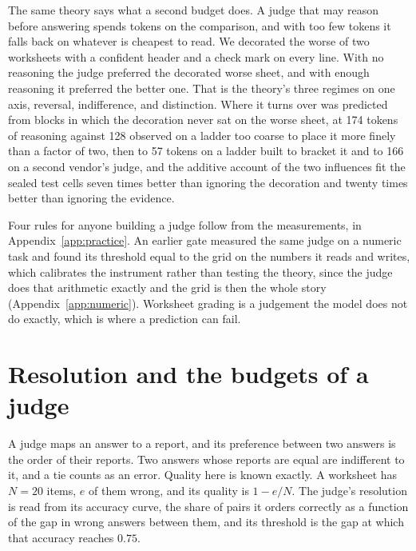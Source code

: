 \documentclass{article}
\theoremstyle{definition}
\theoremstyle{remark}
\begin{document}
The same theory says what a second budget does.
A judge that may reason before answering spends tokens on the comparison, and with too few tokens it falls back on whatever is cheapest to read.
We decorated the worse of two worksheets with a confident header and a check mark on every line.
With no reasoning the judge preferred the decorated worse sheet, and with enough reasoning it preferred the better one.
That is the theory's three regimes on one axis, reversal, indifference, and distinction.
Where it turns over was predicted from blocks in which the decoration never sat on the worse sheet, at 174 tokens of reasoning against 128 observed on a ladder too coarse to place it more finely than a factor of two, then to 57 tokens on a ladder built to bracket it and to 166 on a second vendor's judge, and the additive account of the two influences fit the sealed test cells seven times better than ignoring the decoration and twenty times better than ignoring the evidence.

Four rules for anyone building a judge follow from the measurements, in Appendix~\ref{app:practice}.
An earlier gate measured the same judge on a numeric task and found its threshold equal to the grid on the numbers it reads and writes, which calibrates the instrument rather than testing the theory, since the judge does that arithmetic exactly and the grid is then the whole story (Appendix~\ref{app:numeric}).
Worksheet grading is a judgement the model does not do exactly, which is where a prediction can fail.

\section{Resolution and the budgets of a judge}
\label{sec:budgets}

A judge maps an answer to a report, and its preference between two answers is the order of their reports.
Two answers whose reports are equal are indifferent to it, and a tie counts as an error.
Quality here is known exactly.
A worksheet has $N=20$ items, $e$ of them wrong, and its quality is $1-e/N$.
The judge's resolution is read from its accuracy curve, the share of pairs it orders correctly as a function of the gap in wrong answers between them, and its threshold is the gap at which that accuracy reaches $0.75$.
\end{document}
